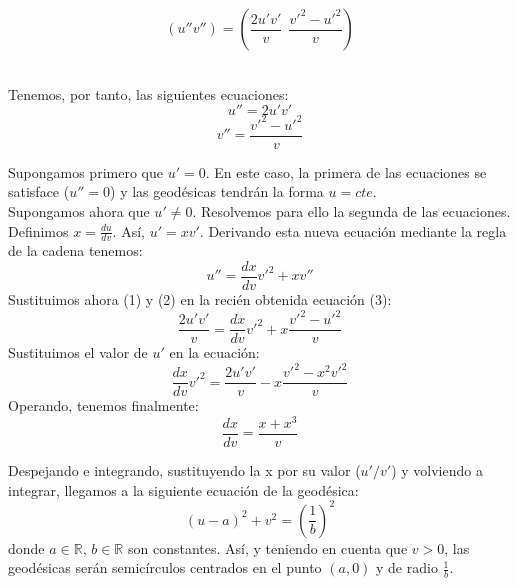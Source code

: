 \documentclass[12pt,a4paper]{article}
\begin{document}
\begin{enumerate}
\begin{itemize}
       
       $$\left(u'' v''\right) =
       \left(\frac{2u'v'}{v}\ \ \frac{v'^2-u'^2}{v}\right)$$\ \
       
       Tenemos, por tanto, las siguientes ecuaciones: \\
       \begin{equation}
         u''=2u'v'
       \end{equation}
       \begin{equation}
         v''=\frac{v'^2-u'^2}{v}
       \end{equation}

       Supongamos primero que $u'=0$. En este caso, la primera de las ecuaciones se satisface ($u''=0$) y las geodésicas tendrán la forma $u=cte$. \\

       Supongamos ahora que $u'\neq0$. Resolvemos para ello la segunda de las ecuaciones. Definimos $x=\frac{du}{dv}$. Así, $u'=xv'$. Derivando esta nueva ecuación mediante la regla de la cadena tenemos:
       \begin{equation}
         u''=\frac{dx}{dv}v'^2+xv''
       \end{equation}
       Sustituimos ahora (1) y (2) en la recién obtenida ecuación (3): \\
       \begin{equation*}
         \frac{2u'v'}{v}=\frac{dx}{dv}v'^2+x\frac{v'^2-u'^2}{v} 
       \end{equation*}
       Sustituimos el valor de $u'$ en la ecuación:
       \begin{equation*}
         \frac{dx}{dv}v'^2=\frac{2u'v'}{v}-x\frac{v'^2-x^2v'^2}{v}
       \end{equation*}
       Operando, tenemos finalmente:
       \begin{equation*}
         \frac{dx}{dv}=\frac{x+x^3}{v}
       \end{equation*}

       Despejando e integrando, sustituyendo la x por su valor ($u'/v'$) y volviendo a integrar, llegamos a la siguiente ecuación de la geodésica:
       \begin{equation*}
         (u-a)^2+v^2=\left(\frac{1}{b}\right)^2
       \end{equation*}
       donde $a\in\mathbb{R}$, $b\in\mathbb{R}$ son constantes. Así, y teniendo en cuenta que $v>0$, las geodésicas serán semicírculos centrados en el punto $(a,0)$ y de radio $\frac{1}{b}$.
  \end{itemize}

\end{enumerate}
\end{document}

